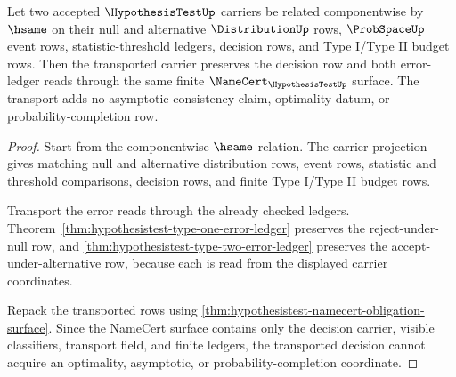 \begin{theorem}
\label{thm:hypothesis-test-decision-stability-under-transport}
Let two accepted $\HypothesisTestUp$ carriers be related componentwise by
$\hsame$ on their null and alternative $\DistributionUp$ rows,
$\ProbSpaceUp$ event rows, statistic-threshold ledgers, decision rows, and
Type I/Type II budget rows. Then the transported carrier preserves the
decision row and both error-ledger reads through the same finite
$\NameCert_{\HypothesisTestUp}$ surface. The transport adds no asymptotic
consistency claim, optimality datum, or probability-completion row.
\end{theorem}
\begin{proof}
Start from the componentwise $\hsame$ relation. The carrier projection gives
matching null and alternative distribution rows, event rows, statistic and
threshold comparisons, decision rows, and finite Type I/Type II budget rows.

Transport the error reads through the already checked ledgers. Theorem~\ref{thm:hypothesistest-type-one-error-ledger}
preserves the reject-under-null row, and
\autoref{thm:hypothesistest-type-two-error-ledger} preserves the
accept-under-alternative row, because each is read from the displayed carrier
coordinates.

Repack the transported rows using
\autoref{thm:hypothesistest-namecert-obligation-surface}. Since the
NameCert surface contains only the decision carrier, visible classifiers,
transport field, and finite ledgers, the transported decision cannot acquire
an optimality, asymptotic, or probability-completion coordinate.
\end{proof}

